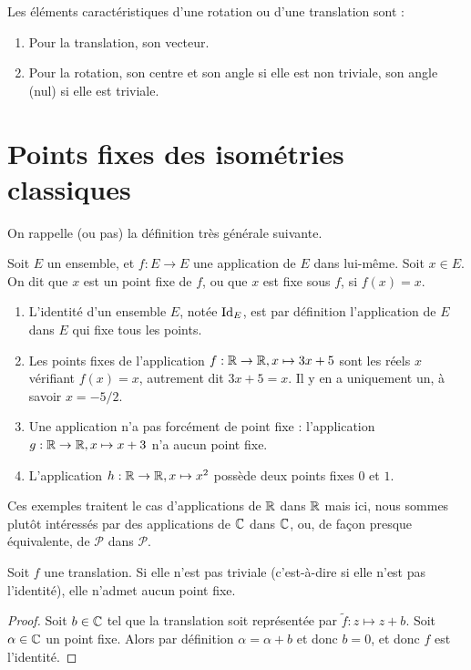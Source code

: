 \begin{definition}
Les éléments caractéristiques d'une rotation ou d'une translation sont :
\begin{enumerate}
\item Pour la translation, son vecteur.
\item Pour la rotation, son centre et son angle si elle est non triviale, son angle (nul) si elle est triviale.
\end{enumerate}
\end{definition}


\section{Points fixes des isométries classiques}

On rappelle (ou pas) la définition très générale suivante.

\begin{definition}
Soit $E$ un ensemble, et $f : E\to E$ une application de $E$ dans lui-même. Soit $x\in E$. On dit que $x$ est un point fixe de $f$, ou que $x$ est fixe sous $f$, si $f(x)=x$.
\end{definition}

\begin{exemples}
\begin{enumerate}
\item L'identité d'un ensemble $E$, notée $\operatorname{Id}_E$, est par définition l'application de $E$ dans $E$ qui fixe tous les points.
\item Les points fixes de l'application $f : \mathbb{R}\to \mathbb{R}, x\mapsto 3x+5$ sont les réels $x$ vérifiant $f(x)=x$, autrement dit $3x+5=x$. Il y en a uniquement un, à savoir $x=-5/2$.
\item Une application n'a pas forcément de point fixe : l'application $g : \mathbb{R}\to \mathbb{R}, x\mapsto x+3$ n'a aucun point fixe.
\item L'application $h : \mathbb{R}\to \mathbb{R}, x\mapsto x^2$ possède deux points fixes $0$ et $1$.
\end{enumerate}
\end{exemples}
Ces exemples traitent le cas d'applications de $\mathbb{R}$ dans $\mathbb{R}$ mais ici, nous sommes plutôt intéressés par des applications de $\mathbb{C}$ dans $\mathbb{C}$, ou, de façon presque équivalente, de $\mathcal P$ dans $\mathcal P$.

\begin{proposition}
Soit $f$ une translation. Si elle n'est pas triviale (c'est-à-dire si elle n'est pas l'identité), elle n'admet aucun point fixe.
\end{proposition}
\begin{proof}
Soit $b\in\mathbb{C}$ tel que la translation soit représentée par $\tilde f : z\mapsto z+b$. Soit $\alpha\in\mathbb{C}$ un point fixe. Alors par définition $\alpha=\alpha+b$ et donc $b=0$, et donc $f$ est l'identité.
\end{proof}

